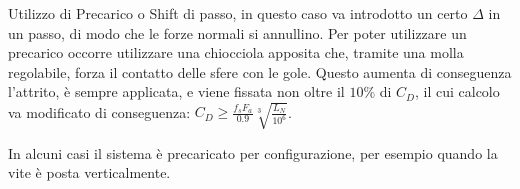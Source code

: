 Utilizzo di Precarico o Shift di passo, in questo caso va introdotto un certo \(\Delta\) in un passo, di modo che le forze normali si annullino. Per poter utilizzare un precarico occorre utilizzare una chiocciola apposita che, tramite una molla regolabile, forza il contatto delle sfere con le gole. Questo aumenta di conseguenza l'attrito, è sempre applicata, e viene fissata non oltre il \(10\%\) di \(C_D\), il cui calcolo va modificato di conseguenza: \( C_D \geqslant \frac{f_s F_a}{0.9} \sqrt[3]{\frac{L_N}{10^6}} \).

In alcuni casi il sistema è precaricato per configurazione, per esempio quando la vite è posta verticalmente.


